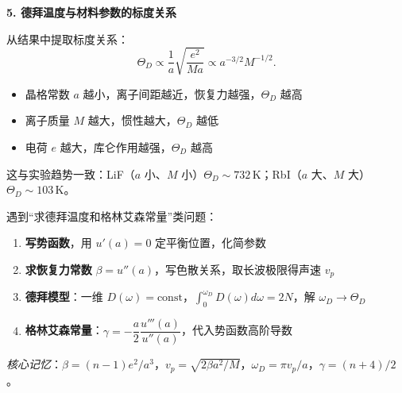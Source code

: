 \begin{insightbox}[物理图像与概念深化]
\textbf{5. 德拜温度与材料参数的标度关系}

从结果中提取标度关系：
\begin{equation}
\Theta_D\propto\frac{1}{a}\sqrt{\frac{e^2}{Ma}}\propto a^{-3/2}M^{-1/2}.
\end{equation}

\begin{itemize}
    \item 晶格常数 $a$ 越小，离子间距越近，恢复力越强，$\Theta_D$ 越高
    \item 离子质量 $M$ 越大，惯性越大，$\Theta_D$ 越低
    \item 电荷 $e$ 越大，库仑作用越强，$\Theta_D$ 越高
\end{itemize}

这与实验趋势一致：LiF（$a$ 小、$M$ 小）$\Theta_D\sim732\,\mathrm{K}$；RbI（$a$ 大、$M$ 大）$\Theta_D\sim103\,\mathrm{K}$。
\end{insightbox}

\begin{thinkbox}
遇到``求德拜温度和格林艾森常量''类问题：
\begin{enumerate}
    \item \textbf{写势函数}，用 $u'(a)=0$ 定平衡位置，化简参数
    \item \textbf{求恢复力常数} $\beta=u''(a)$，写色散关系，取长波极限得声速 $v_p$
    \item \textbf{德拜模型}：一维 $D(\omega)=\text{const}$，$\int_0^{\omega_D}D(\omega)d\omega=2N$，解 $\omega_D\to\Theta_D$
    \item \textbf{格林艾森常量}：$\gamma=-\dfrac{a}{2}\dfrac{u'''(a)}{u''(a)}$，代入势函数高阶导数
\end{enumerate}
\textit{核心记忆}：$\beta=(n-1)e^2/a^3$，$v_p=\sqrt{2\beta a^2/M}$，$\omega_D=\pi v_p/a$，$\gamma=(n+4)/2$。
\end{thinkbox}
